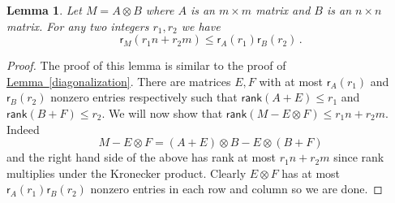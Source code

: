 \documentclass[11pt]{article}
\numberwithin{equation}{section}
\newtheorem{lemma}[theorem]{Lemma}
\theoremstyle{definition}
\theoremstyle{plain}
\newcommand{\expref}[2]{\hyperref[#2]{#1~\ref{#2}}}
\theoremstyle{definition}
\newcommand\rank{\textsf{rank}}
\begin{document}
\begin{lemma}\label{products}
Let $M = A \otimes B$ where $A$ is an $m \times m$ matrix and $B$ is an $n \times n$ matrix.  For any two integers $r_1,r_2$ we have
\[\textsf{r}_M(r_1n + r_2m) \leq \textsf{r}_A(r_1)\textsf{r}_B(r_2) \,. \]
\end{lemma}
\begin{proof}
The proof of this lemma is similar to the proof of \expref{Lemma}{diagonalization}.  There are matrices $E,F$ with at most $\textsf{r}_A(r_1)$ and $\textsf{r}_B(r_2)$ nonzero entries respectively such that $\rank(A+E) \leq r_1$ and $\rank(B+F) \leq r_2$.  We will now show that $\rank(M - E \otimes F) \leq r_1n + r_2m$.  Indeed
\[
M - E \otimes F = (A+E) \otimes B - E \otimes (B+F)
\]
and the right hand side of the above has rank at most $r_1n + r_2m$ since rank multiplies under the Kronecker product.  Clearly $E \otimes F$ has at most $\textsf{r}_A(r_1)\textsf{r}_B(r_2)$ nonzero entries in each row and column so we are done.
\end{proof}
\end{document}
